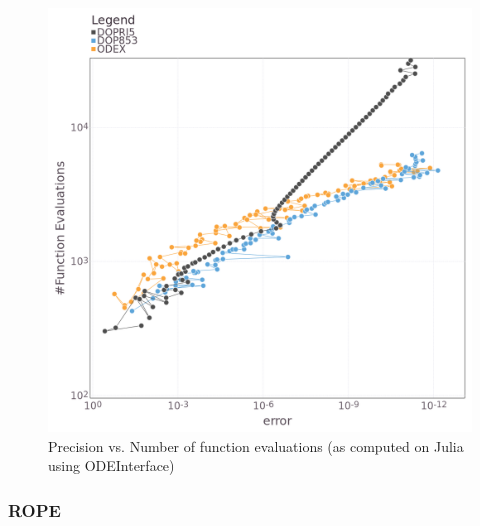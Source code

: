 \documentclass[notitlepage,12pt]{article}
\begin{document}
\begin{figure}[H]
\centering
\includegraphics[scale=0.4]{../ImagesAndPDFs/Plots/ArenstorfPrecisionTest.png}
\caption{Precision vs. Number of function evaluations (as computed on Julia using ODEInterface)}
\label{fig:arenJulia}
\end{figure}

\subsubsection{ROPE}
\label{sub:rope}
\end{document}
